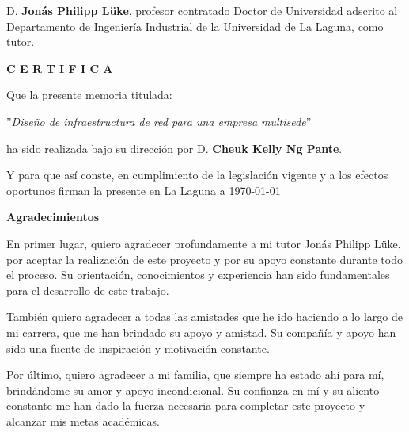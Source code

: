 \documentclass[spanish,a4paper,11pt,oneside]{extreport}
\begin{document}
\newpage
\thispagestyle{empty}

D. {\bf Jonás Philipp Lüke}, profesor contratado Doctor de Universidad adscrito al Departamento de Ingeniería Industrial de la Universidad de La Laguna, como tutor.

\bigskip
\bigskip
{\bf C E R T I F I C A}

\bigskip
\bigskip

Que la presente memoria titulada:

\bigskip
''{\it Diseño de infraestructura de red para una empresa multisede}''

\bigskip
\bigskip
\bigskip

\noindent ha sido realizada bajo su dirección por D. {\bf Cheuk Kelly Ng Pante}.

\bigskip
\bigskip

Y para que así conste, en cumplimiento de la legislación vigente y a los efectos
oportunos firman la presente en La Laguna a \today


\newpage
\thispagestyle{empty}
\vspace*{\fill}
\begin{center}
\end{center}
\vspace*{\fill}
\newpage


\newpage
\thispagestyle{empty}

{ \flushright

	\begin{LARGE}
		\textbf{Agradecimientos}
	\end{LARGE}

	\hspace{3mm}

	En primer lugar, quiero agradecer profundamente a mi tutor Jonás Philipp Lüke, por aceptar la
	realización de este proyecto y por su apoyo constante durante todo el proceso. Su orientación,
	conocimientos y experiencia han sido fundamentales para el desarrollo de este trabajo.

	\vspace{0.5cm}
	También quiero agradecer a todas las amistades que he ido haciendo a lo largo de mi carrera, que me han
	brindado su apoyo y amistad. Su compañía y apoyo han sido una fuente de inspiración y motivación constante.

	\vspace{0.5cm}
	Por último, quiero agradecer a mi familia, que siempre ha estado ahí para mí, brindándome su amor
	y apoyo incondicional. Su confianza en mí y su aliento constante me han dado la fuerza necesaria para
	completar este proyecto y alcanzar mis metas académicas.
}
\end{document}
